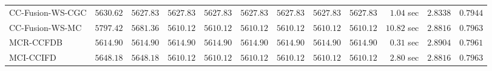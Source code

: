 \begin{table}[H]
\begin{tabular}{lrrrrrrrrrrr}
    CC-Fusion-WS-CGC & $      5630.62$ & $      5627.83$ & $      5627.83$ & $      5627.83$ & $      5627.83$ & $      5627.83$ & $      5627.83$ & $      5627.83$ & $         1.04$ sec    & $       2.8338$  & $       0.7944$ \\ 
     CC-Fusion-WS-MC & $      5797.42$ & $      5681.36$ & $      5610.12$ & $      5610.12$ & $      5610.12$ & $      5610.12$ & $      5610.12$ & $      5610.12$ & $        10.82$ sec    & $       2.8816$  & $       0.7963$ \\ 
\cmidrule{1-1} 
           MCR-CCFDB & $      5614.90$ & $      5614.90$ & $      5614.90$ & $      5614.90$ & $      5614.90$ & $      5614.90$ & $      5614.90$ & $      5614.90$ & $         0.31$ sec    & $       2.8904$  & $       0.7961$ \\ 
\cmidrule{1-1} 
           MCI-CCIFD & $      5648.18$ & $      5648.18$ & $      5610.12$ & $      5610.12$ & $      5610.12$ & $      5610.12$ & $      5610.12$ & $      5610.12$ & $         2.80$ sec    & $       2.8816$  & $       0.7963$ \\ 
\bottomrule
\end{tabular}
\end{table}

